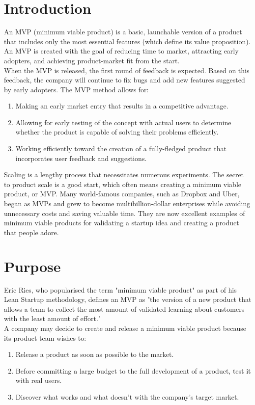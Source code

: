 \documentclass[paper=a4, fontsize=11pt]{scrartcl}
\numberwithin{equation}{section}		%
\numberwithin{figure}{section}			%
\numberwithin{table}{section}				%
\begin{document}
\section{Introduction}
An MVP (minimum viable product) is a basic, launchable version of a product that includes only the most essential features (which define its value proposition). An MVP is created with the goal of reducing time to market, attracting early adopters, and achieving product-market fit from the start.\\
When the MVP is released, the first round of feedback is expected. Based on this feedback, the company will continue to fix bugs and add new features suggested by early adopters.
The MVP method allows for:
\begin{enumerate}
    \item Making an early market entry that results in a competitive advantage.
    \item Allowing for early testing of the concept with actual users to determine whether the product is capable of solving their problems efficiently.
    \item Working efficiently toward the creation of a fully-fledged product that incorporates user feedback and suggestions.
\end{enumerate}
Scaling is a lengthy process that necessitates numerous experiments. The secret to product scale is a good start, which often means creating a minimum viable product, or MVP. Many world-famous companies, such as Dropbox and Uber, began as MVPs and grew to become multibillion-dollar enterprises while avoiding unnecessary costs and saving valuable time. They are now excellent examples of minimum viable products for validating a startup idea and creating a product that people adore.

\newpage

\section{Purpose}
Eric Ries, who popularised the term "minimum viable product" as part of his Lean Startup methodology, defines an MVP as "the version of a new product that allows a team to collect the most amount of validated learning about customers with the least amount of effort."\\
A company may decide to create and release a minimum viable product because its product team wishes to:
\begin{enumerate}
    \item Release a product as soon as possible to the market.
    \item Before committing a large budget to the full development of a product, test it with real users.
    \item Discover what works and what doesn't with the company's target market.
\end{enumerate}
\end{document}

